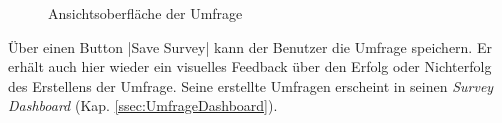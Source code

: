 \begin{figure}[!htb]
	\caption[Ansichtsoberfläche der Umfrage]{\label{fig:SurveyCreatorViewImplement}Ansichtsoberfläche der Umfrage \\ \quelleScreenshot}
\end{figure}

Über einen Button \jinline|Save Survey| kann der Benutzer die Umfrage speichern.
Er erhält auch hier wieder ein visuelles Feedback über den Erfolg oder Nichterfolg des Erstellens der Umfrage. 
Seine erstellte Umfragen erscheint in seinen \emph{Survey Dashboard} (Kap. \vref{ssec:UmfrageDashboard}).
